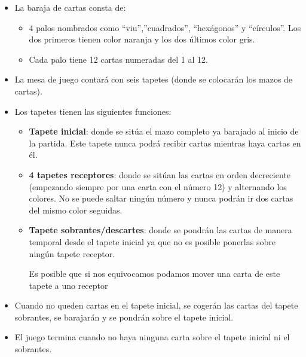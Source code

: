 \documentclass{\ClassPath/viu-tfm-template}
\begin{document}
\vspace{-1em}
\begin{itemize}
    \item La baraja de cartas consta de:
    \begin{itemize}
        \item 4 palos nombrados como “viu”,”cuadrados”, “hexágonos” y “círculos”. Los dos primeros tienen color naranja y los dos últimos color gris.
        \item Cada palo tiene 12 cartas numeradas del 1 al 12.
    \end{itemize}
    \item La mesa de juego contará con seis tapetes (donde se colocarán los mazos de cartas).
    \item Los tapetes tienen las siguientes funciones:
    \begin{itemize}
        \item \textbf{Tapete inicial}: donde se sitúa el mazo completo ya barajado al inicio de la partida. Este tapete nunca podrá recibir cartas mientras haya cartas en él.
        \item \textbf{4 tapetes receptores}: donde se sitúan las cartas en orden decreciente (empezando siempre por una carta con el número 12) y alternando los colores. No se puede saltar ningún número y nunca podrán ir dos cartas del mismo color seguidas.
        \item \textbf{Tapete sobrantes/descartes}: donde se pondrán las cartas de manera temporal desde el tapete inicial ya que no es posible ponerlas sobre ningún tapete receptor.

        Es posible que si nos equivocamos podamos mover una carta de este tapete a uno receptor
    \end{itemize}

    \item Cuando no queden cartas en el tapete inicial, se cogerán las cartas del  tapete sobrantes, se barajarán y se pondrán sobre el tapete inicial.

    \item El juego termina cuando no haya ninguna carta sobre el tapete inicial ni el sobrantes.
\end{itemize}
\vspace{-1em}
\end{document}
